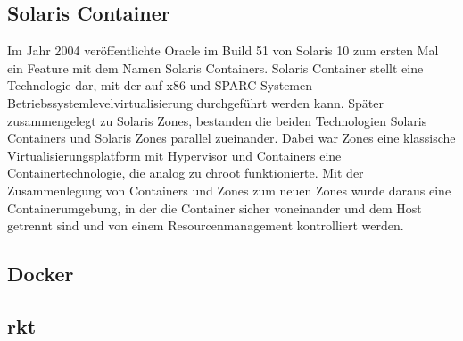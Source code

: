 \subsection*{Solaris Container}
\label{sec:solariscontainer}

Im Jahr 2004 veröffentlichte Oracle im Build 51 von Solaris 10 zum ersten Mal ein Feature mit dem Namen Solaris Containers. Solaris Container stellt eine Technologie dar, mit der auf x86 und SPARC-Systemen Betriebssystemlevelvirtualisierung durchgeführt werden kann. Später zusammengelegt zu Solaris Zones, bestanden die beiden Technologien Solaris Containers und Solaris Zones parallel zueinander. Dabei war Zones eine klassische Virtualisierungsplatform mit Hypervisor und Containers eine Containertechnologie, die analog zu chroot funktionierte. Mit der Zusammenlegung von Containers und Zones zum neuen Zones wurde daraus eine Containerumgebung, in der die Container sicher voneinander und dem Host getrennt sind und von einem Resourcenmanagement kontrolliert werden.\cite{OracleZonesIntro,OracleZonesOver}
	




\subsection*{Docker}
\label{sec:Docker}





\subsection*{rkt}
\label{sec:rkt}



